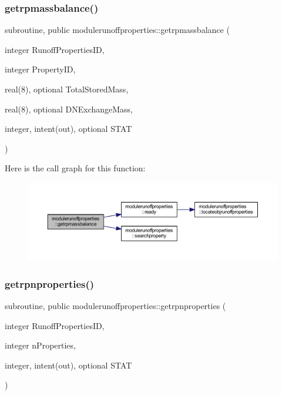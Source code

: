 \subsubsection{\texorpdfstring{getrpmassbalance()}{getrpmassbalance()}}
{\footnotesize\ttfamily subroutine, public modulerunoffproperties\+::getrpmassbalance (\begin{DoxyParamCaption}\item[{integer}]{Runoff\+Properties\+ID,  }\item[{integer}]{Property\+ID,  }\item[{real(8), optional}]{Total\+Stored\+Mass,  }\item[{real(8), optional}]{D\+N\+Exchange\+Mass,  }\item[{integer, intent(out), optional}]{S\+T\+AT }\end{DoxyParamCaption})}

Here is the call graph for this function\+:\nopagebreak
\begin{figure}[H]
\begin{center}
\leavevmode
\includegraphics[width=350pt]{namespacemodulerunoffproperties_a9588522d88fead0d0a355bc1c32062b9_cgraph}
\end{center}
\end{figure}
\mbox{\label{namespacemodulerunoffproperties_a4e8dd453019d74193b19d83465d41e85}} 
\subsubsection{\texorpdfstring{getrpnproperties()}{getrpnproperties()}}
{\footnotesize\ttfamily subroutine, public modulerunoffproperties\+::getrpnproperties (\begin{DoxyParamCaption}\item[{integer}]{Runoff\+Properties\+ID,  }\item[{integer}]{n\+Properties,  }\item[{integer, intent(out), optional}]{S\+T\+AT }\end{DoxyParamCaption})}

